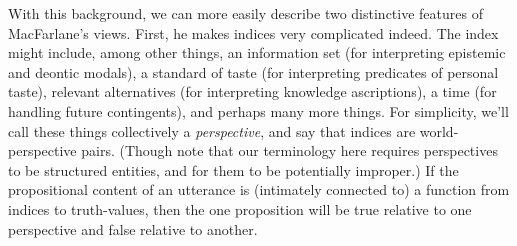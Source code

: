 \documentclass[
  11pt,
  letterpaper,
  DIV=11,
  numbers=noendperiod,
  twoside]{scrartcl}
\begin{document}
With this background, we can more easily describe two distinctive
features of MacFarlane's views. First, he makes indices very complicated
indeed. The index might include, among other things, an information set
(for interpreting epistemic and deontic modals), a standard of taste
(for interpreting predicates of personal taste), relevant alternatives
(for interpreting knowledge ascriptions), a time (for handling future
contingents), and perhaps many more things. For simplicity, we'll call
these things collectively a \emph{perspective}, and say that indices are
world-perspective pairs. (Though note that our terminology here requires
perspectives to be structured entities, and for them to be potentially
improper.) If the propositional content of an utterance is (intimately
connected to) a function from indices to truth-values, then the one
proposition will be true relative to one perspective and false relative
to another.
\end{document}

